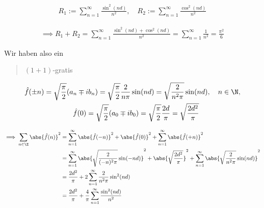 \begin{solution}
\begin{enumerate}[label = \arabic*.]
    \begin{align*}
        R_1
        :=
        \sum_{n=1}^\infty
        \frac{\sin^2(n d)}{n^2},
        \quad
        R_2
        :=
        \sum_{n=1}^\infty
        \frac{\cos^2(n d)}{n^2}
    \end{align*}
    
    \begin{align*}
        \implies
        R_1 + R_2
        =
        \sum_{n=1}^\infty
        \frac
        {
            \sin^2(n d)
            +
            \cos^2(n d)
        }{n^2}    
        =
        \sum_{n=1}^\infty
        \frac{1}{n^2}
        =
        \frac{\pi^2}{6}
    \end{align*}
    
    Wir haben also ein \blockquote{$(1 + 1)$-gratis}.

    \begin{gather*}
        \hat f(\pm n)
        =
        \sqrt \frac{\pi}{2}
        (a_n \mp i b_n)
        =
        \sqrt \frac{\pi}{2}
        \frac{2}{n \pi}
        \sin(n d)
        =
        \sqrt \frac{2}{n^2 \pi}
        \sin(n d),
        \quad
        n \in \N, \\
        \quad
        \hat f(0)
        =
        \sqrt \frac{\pi}{2}
        (a_0 \mp i b_0)
        =
        \sqrt \frac{\pi}{2}
        \frac{2 d}{\pi}
        =
        \sqrt \frac{2 d^2}{\pi}
    \end{gather*}

    \begin{align*}
        \implies
        \sum_{n \in \Z}
        \abs{\hat f(n)}^2
        & =
        \sum_{n=1}^\infty
        \abs{\hat f(-n)}^2
        +
        \abs{\hat f(0)}^2
        +
        \sum_{n=1}^\infty
        \abs{\hat f(+n)}^2 \\
        & =
        \sum_{n=1}^\infty
        \abs
        {
            \sqrt \frac{2}{(-n)^2 \pi}
            \sin(-n d)  
        }^2
        +
        \abs
        {
            \sqrt \frac{2 d^2}{\pi}
        }^2
        +
        \sum_{n=1}^\infty
        \abs
        {
            \sqrt \frac{2}{n^2 \pi}
            \sin(n d)   
        }^2 \\
        & =
        \frac{2 d^2}{\pi}
        +
        2 \sum_{n=1}^\infty
        \frac{2}{n^2 \pi}
        \sin^2(n d) \\
        & =
        \frac{2 d^2}{\pi}
        +
        \frac{4}{\pi}
        \sum_{n=1}^\infty
        \frac
        {
            \sin^2(n d)
        }{n^2}
    \end{align*}


\end{enumerate}
\end{solution}
